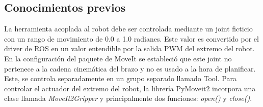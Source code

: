 \subsection*{Conocimientos previos}
\noindent La herramienta acoplada al robot debe ser controlada mediante un joint ficticio con un rango de movimiento de 0.0 a 1.0 radianes. Este 
valor es convertido por el driver de ROS en un valor entendible por la salida PWM del extremo del robot. En la configuración del paquete de MoveIt se 
estableció que este joint no pertenece a la cadena cinemática del brazo y no es usado a la hora de planificar. Este, se controla separadamente 
en un grupo separado llamado Tool. Para controlar el actuador del extremo del robot, la librería PyMoveit2 incorpora una clase llamada \textit{MoveIt2Gripper} y principalmente dos 
funciones: \textit{open()} y \textit{close()}.

